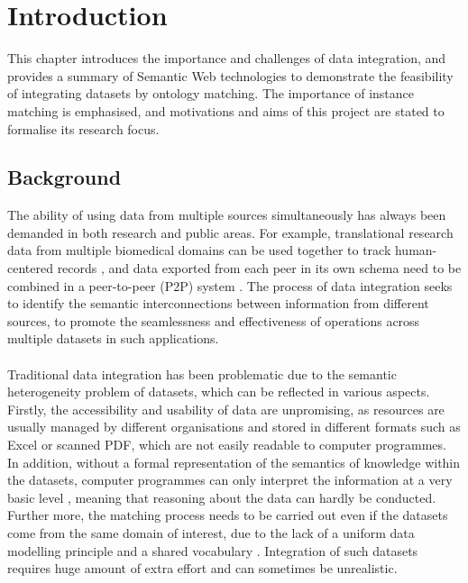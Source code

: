 \chapter{Introduction}

This chapter introduces the importance and challenges of data integration, and provides a summary of Semantic Web technologies to demonstrate the feasibility of integrating datasets by ontology matching. The importance of instance matching is emphasised, and motivations and aims of this project are stated to formalise its research focus.


\section{Background}

The ability of using data from multiple sources simultaneously has always been demanded in both research and public areas. For example, translational research data from multiple biomedical domains can be used together to track human-centered records \cite{DBLP:journals/jbi/WangLFCOHSO09}, and data exported from each peer in its own schema need to be combined in a peer-to-peer (P2P) system \cite{DBLP:conf/dbisp2p/CalvaneseDGLR03}. The process of data integration seeks to identify the semantic interconnections between information from different sources, to promote the seamlessness and effectiveness of operations across multiple datasets in such applications.
\\\\
Traditional data integration has been problematic due to the semantic heterogeneity problem of datasets, which can be reflected in various aspects. Firstly, the accessibility and usability of data are unpromising, as resources are usually managed by different organisations and stored in different formats such as Excel or scanned PDF, which are not easily readable to computer programmes. In addition, without a formal representation of the semantics of knowledge within the datasets, computer programmes can only interpret the information at a very basic level \cite{DBLP:journals/expert/ShadboltBH06}, meaning that reasoning about the data can hardly be conducted. Further more, the matching process needs to be carried out even if the datasets come from the same domain of interest, due to the lack of a uniform data modelling principle and a shared vocabulary \cite{euzenat2013d}. Integration of such datasets requires huge amount of extra effort and can sometimes be unrealistic.
